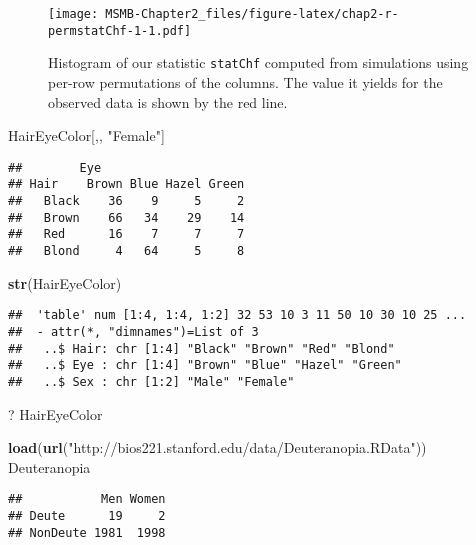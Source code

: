 \documentclass[]{article}
\newenvironment{Shaded}{\begin{snugshade}}{\end{snugshade}}
\newcommand{\KeywordTok}[1]{\textcolor[rgb]{0.13,0.29,0.53}{\textbf{#1}}}
\newcommand{\StringTok}[1]{\textcolor[rgb]{0.31,0.60,0.02}{#1}}
\newcommand{\NormalTok}[1]{#1}
\begin{document}
\begin{figure}
\centering
\texttt{[image: MSMB-Chapter2\_files/figure-latex/chap2-r-permstatChf-1-1.pdf]}
\caption{Histogram of our statistic \texttt{statChf} computed from
simulations using per-row permutations of the columns. The value it
yields for the observed data is shown by the red line.}
\end{figure}

\begin{Shaded}
\begin{Highlighting}[]
\NormalTok{HairEyeColor[,, }\StringTok{"Female"}\NormalTok{]}
\end{Highlighting}
\end{Shaded}

\begin{verbatim}
##        Eye
## Hair    Brown Blue Hazel Green
##   Black    36    9     5     2
##   Brown    66   34    29    14
##   Red      16    7     7     7
##   Blond     4   64     5     8
\end{verbatim}

\begin{Shaded}
\begin{Highlighting}[]
\KeywordTok{str}\NormalTok{(HairEyeColor)}
\end{Highlighting}
\end{Shaded}

\begin{verbatim}
##  'table' num [1:4, 1:4, 1:2] 32 53 10 3 11 50 10 30 10 25 ...
##  - attr(*, "dimnames")=List of 3
##   ..$ Hair: chr [1:4] "Black" "Brown" "Red" "Blond"
##   ..$ Eye : chr [1:4] "Brown" "Blue" "Hazel" "Green"
##   ..$ Sex : chr [1:2] "Male" "Female"
\end{verbatim}

\begin{Shaded}
\begin{Highlighting}[]
\NormalTok{? HairEyeColor}
\end{Highlighting}
\end{Shaded}

\begin{Shaded}
\begin{Highlighting}[]
\KeywordTok{load}\NormalTok{(}\KeywordTok{url}\NormalTok{(}\StringTok{"http://bios221.stanford.edu/data/Deuteranopia.RData"}\NormalTok{))}
\NormalTok{Deuteranopia}
\end{Highlighting}
\end{Shaded}

\begin{verbatim}
##           Men Women
## Deute      19     2
## NonDeute 1981  1998
\end{verbatim}
\end{document}
